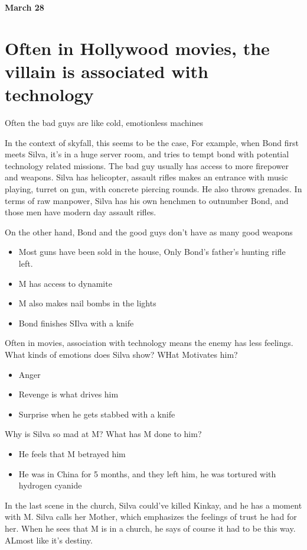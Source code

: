 \documentclass{article}
\begin{document}
    \textbf{March 28}
    \section{Often in Hollywood movies, the villain is associated with technology}
    Often the bad guys are like cold, emotionless machines

    In the context of skyfall, this seems to be the case, For example, when Bond first meets Silva, it's in a huge server room, and
    tries to tempt bond with potential technology related missions. The bad guy usually has access to more firepower and weapons.
    Silva has helicopter, assault rifles makes an entrance with music playing, turret on gun, with concrete piercing rounds.
    He also throws grenades. In terms of raw manpower, Silva has his own henchmen to outnumber Bond, and those men have
    modern day assault rifles.

    On the other hand, Bond and the good guys don't have as many good weapons
    \begin{itemize}
      \item Most guns have been sold in the house, Only Bond's father's hunting rifle left.
      \item M has access to dynamite
      \item M also makes nail bombs in the lights
      \item Bond finishes SIlva with a knife
    \end{itemize}

    Often in movies, association with technology means the enemy has less feelings.
    What kinds of emotions does Silva show? WHat Motivates him?
    \begin{itemize}
      \item Anger
      \item Revenge is what drives him
      \item Surprise when he gets stabbed with a knife
    \end{itemize}
    Why is Silva so mad at M? What has M done to him?
    \begin{itemize}
      \item He feels that M betrayed him
      \item He was in China for 5 months, and they left him, he was tortured with hydrogen cyanide
    \end{itemize}

    In the last scene in the church, Silva could've killed Kinkay, and he has a moment with M.
    Silva calls her Mother, which emphasizes the feelings of trust he had for her.
    When he sees that M is in a church, he says of course it had to be this way. ALmost like it's destiny.
\end{document}
